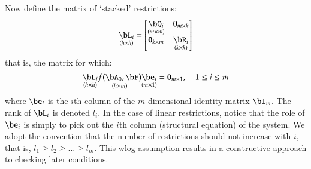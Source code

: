 \documentclass [12pt]{article}
\begin{document}
    Now define the matrix of `stacked' restrictions:
    \begin{equation*}
        \underset{(h \times h)}{\bL_i} = \begin{bmatrix} \underset{(m \times m)}{\bQ_i} & \mathbf{0}_{m \times k} \\ \mathbf{0}_{k \times m} & \underset{(k \times k)}{\bR_i} \end{bmatrix}
    \end{equation*}
    that is, the matrix for which:
    \begin{equation}\label{eq:rwz4}
        \underset{(h \times h)}{\bL_i} \underset{(h \times m)}{f( \bA_0, \bF )} \underset{(m \times 1)}{\be_i} = \mathbf{0}_{m \times 1}, \quad 1 \le i \le m
    \end{equation}
    where $\be_i$ is the $i$th column of the $m$-dimensional identity matrix $\bI_m$. The rank of $\bL_i$ is denoted $l_i$. In the case of linear restrictions, notice that the role of $\be_i$ is simply to pick out the $i$th column (structural equation) of the system. We adopt the convention that the number of restrictions should not increase with $i$, that is, $l_1 \ge l_2 \ge \dots \ge l_m$. This wlog assumption results in a constructive approach to checking later conditions.
    \bigskip
    
\end{document}
